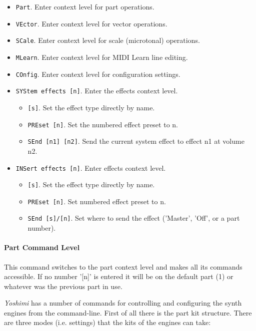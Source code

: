    \begin{itemize}
      \item \texttt{Part}. Enter context level for part operations.
      \item \texttt{VEctor}. Enter context level for vector operations.
      \item \texttt{SCale}. Enter context level for scale (microtonal)
      operations.
      \item \texttt{MLearn}. Enter context level for MIDI Learn line editing.
      \item \texttt{COnfig}. Enter context level for configuration settings.
      \item \texttt{SYStem effects [n]}. Enter the effects context level.
      \begin{itemize}
         \item \texttt{[s]}.  Set the effect type directly by name.
         \item \texttt{PREset [n]}. Set the numbered effect preset to n.
         \item \texttt{SEnd [n1] [n2]}. Send the current system effect to
         effect n1 at volume n2.
      \end{itemize}
      \item \texttt{INSert effects [n]}. Enter effects context level.
      \begin{itemize}
         \item \texttt{[s]}. Set the effect type directly by name.
         \item \texttt{PREset [n]}. Set numbered effect preset to n.
         \item \texttt{SEnd [s]/[n]}. Set where to send the effect
            ('Master', 'Off', or a part number).
      \end{itemize}
   \end{itemize}

\paragraph{Part Command Level}
\label{paragraph:command_line_context_level_part}

   This command switches to the part context level and makes all its commands
   accessible.  If no number '[n]' is entered it will be on the default part
   (1) or whatever was the previous part in use.

   \textsl{Yoshimi} has a number of commands for controlling and configuring
   the synth engines from the command-line. First of all there is the part
   kit structure. There are three modes (i.e. settings) that the kits of the
   engines can take:

